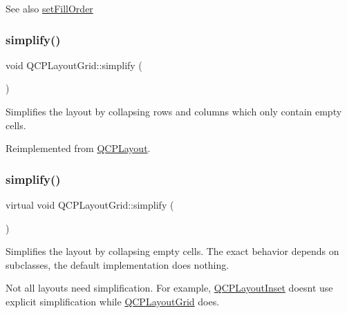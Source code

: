 \begin{DoxySeeAlso}{See also}
\hyperlink{class_q_c_p_layout_grid_affc2f3cfd22f28698c5b29b960d2a391}{set\+Fill\+Order} 
\end{DoxySeeAlso}
\mbox{\label{class_q_c_p_layout_grid_a38621ca7aa633b6a9a88617df7f08672}} 
\subsubsection{\texorpdfstring{simplify()}{simplify()}\hspace{0.1cm}{\footnotesize\ttfamily [1/2]}}
{\footnotesize\ttfamily void Q\+C\+P\+Layout\+Grid\+::simplify (\begin{DoxyParamCaption}{ }\end{DoxyParamCaption})\hspace{0.3cm}{\ttfamily [virtual]}}

Simplifies the layout by collapsing rows and columns which only contain empty cells. 

Reimplemented from \hyperlink{class_q_c_p_layout_a41e6ac049143866e8f8b4964efab01b2}{Q\+C\+P\+Layout}.

\mbox{\label{class_q_c_p_layout_grid_a07841807e57ea5f6f0072250797defc0}} 
\subsubsection{\texorpdfstring{simplify()}{simplify()}\hspace{0.1cm}{\footnotesize\ttfamily [2/2]}}
{\footnotesize\ttfamily virtual void Q\+C\+P\+Layout\+Grid\+::simplify (\begin{DoxyParamCaption}{ }\end{DoxyParamCaption})\hspace{0.3cm}{\ttfamily [virtual]}}

Simplifies the layout by collapsing empty cells. The exact behavior depends on subclasses, the default implementation does nothing.

Not all layouts need simplification. For example, \hyperlink{class_q_c_p_layout_inset}{Q\+C\+P\+Layout\+Inset} doesn\textquotesingle{}t use explicit simplification while \hyperlink{class_q_c_p_layout_grid}{Q\+C\+P\+Layout\+Grid} does. 

